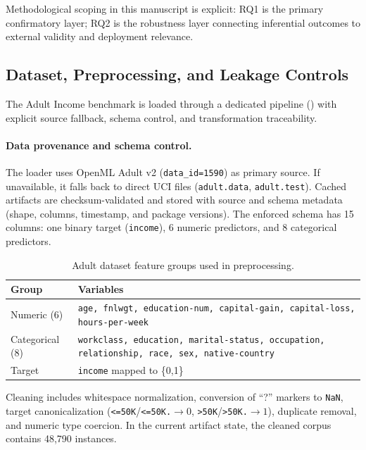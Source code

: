 \documentclass[twoside,11pt]{article}
\begin{document}
Methodological scoping in this manuscript is explicit: RQ1 is the primary
confirmatory layer; RQ2 is the robustness layer connecting inferential outcomes
to external validity and deployment relevance.

\subsection{Dataset, Preprocessing, and Leakage Controls}
The Adult Income benchmark is loaded through a dedicated pipeline
() with explicit source fallback,
schema control, and transformation traceability.

\paragraph{Data provenance and schema control.}
The loader uses OpenML Adult v2 (\texttt{data\_id=1590}) as primary source.
If unavailable, it falls back to direct UCI files
(\texttt{adult.data}, \texttt{adult.test}).
Cached artifacts are checksum-validated and stored with source and schema
metadata (shape, columns, timestamp, and package versions).
The enforced schema has 15 columns: one binary target (\texttt{income}),
6 numeric predictors, and 8 categorical predictors.

\begin{table}[t]
\centering
\caption{Adult dataset feature groups used in preprocessing.}
\begin{tabularx}{\linewidth}{l X}
\toprule
\textbf{Group} & \textbf{Variables} \\
\midrule
Numeric (6) & \texttt{age, fnlwgt, education-num, capital-gain, capital-loss, hours-per-week} \\
Categorical (8) & \texttt{workclass, education, marital-status, occupation, relationship, race, sex, native-country} \\
Target & \texttt{income} mapped to \{0,1\} \\
\bottomrule
\end{tabularx}
\label{tab:adult-schema}
\end{table}

Cleaning includes whitespace normalization, conversion of ``?'' markers to
\texttt{NaN}, target canonicalization
(\texttt{<=50K}/\texttt{<=50K.}$\rightarrow 0$,
\texttt{>50K}/\texttt{>50K.}$\rightarrow 1$), duplicate removal, and numeric
type coercion. In the current artifact state, the cleaned corpus contains
48{,}790 instances.
\end{document}
